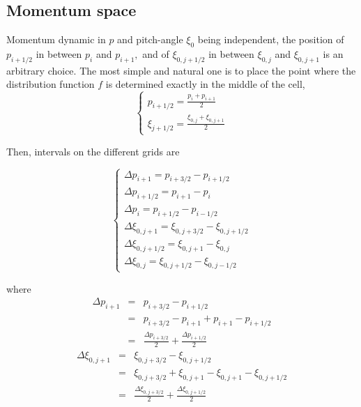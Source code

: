 
\subsection{Momentum space}

Momentum dynamic in $p$ and pitch-angle $\xi _{0}$ being independent, the
position of $p_{i+1/2}$ in between $p_{i}$ and $p_{i+1},$ and of $\xi
_{0,j+1/2}$ in between $\xi _{0,j}$ and $\xi _{0,j+1}$ is an arbitrary
choice. The most simple and natural one is to place the point where the
distribution function $f$ is determined exactly in the middle of the cell,
\begin{equation}
\left\{
\begin{array}{l}
p_{i+1/2}=\frac{p_{i}+p_{i+1}}{2} \\
\xi _{j+1/2}=\frac{\xi _{0,j}+\xi _{0,j+1}}{2}
\end{array}
\right.
\end{equation}

Then, intervals on the different grids are

\begin{equation}
\left\{
\begin{array}{l}
\Delta p_{i+1}=p_{i+3/2}-p_{i+1/2} \\
\Delta p_{i+1/2}=p_{i+1}-p_{i} \\
\Delta p_{i}=p_{i+1/2}-p_{i-1/2} \\
\Delta \xi _{0,j+1}=\xi _{0,j+3/2}-\xi _{0,j+1/2} \\
\Delta \xi _{0,j+1/2}=\xi _{0,j+1}-\xi _{0,j} \\
\Delta \xi _{0,j}=\xi _{0,j+1/2}-\xi _{0,j-1/2}
\end{array}
\right.
\end{equation}

where
\begin{eqnarray}
\Delta p_{i+1} &=&p_{i+3/2}-p_{i+1/2}  \nonumber \\
&=&p_{i+3/2}-p_{i+1}+p_{i+1}-p_{i+1/2}  \nonumber \\
&=&\frac{\Delta p_{i+3/2}}{2}+\frac{\Delta p_{i+1/2}}{2}
\end{eqnarray}
\begin{eqnarray}
\Delta \xi _{0,j+1} &=&\xi _{0,j+3/2}-\xi _{0,j+1/2}  \nonumber \\
&=&\xi _{0,j+3/2}+\xi _{0,j+1}-\xi _{0,j+1}-\xi _{0,j+1/2}  \nonumber \\
&=&\frac{\Delta \xi _{0,j+3/2}}{2}+\frac{\Delta \xi _{0,j+1/2}}{2}
\end{eqnarray}

